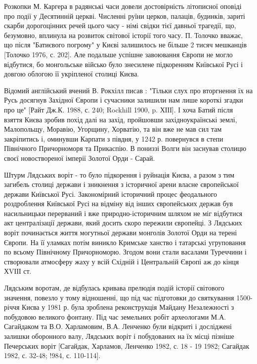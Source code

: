 Розкопки М. Каргера в радянські часи довели достовірність літописної оповіді
про події у Десятинній церкві. Численні руїни церков, палаців, будинків, зариті
скарби дорогоцінних речей цього часу - німі свідки тієї давньої трагедії, що,
безумовно, вплинула на розвиток світової історії того часу. П. Толочко вважає,
що після "Батиєвого погрому" у Києві залишилось не більше 2 тисяч мешканців
[Толочко 1976, с. 202]. Але подальше успішне завоювання Європи не могло
відбутися, бо монгольське військо було знесилене підкоренням Київської Русі і
довгою облогою її укріпленої столиці Києва.

Відомий англійський вчений В. Рокхілл писав : "Тільки слух про вторгнення їх на
Русь досягнув Західної Європи і сучасники залишили нам лише короткі згадки про
це" [Райт Дж.К. 1988, с. 240; Rockhill 1900, p. ХІІІ]. І хоча Батий після
взяття Києва зробив похід далі на захід, пройшовши західноукраїнські землі,
Малопольщу, Моравію, Угорщину, Хорватію, та він вже не мав сил там закріпитись
і, оминувши Карпати з півдня, у 1242 р. повернувся в степи Північного
Причорноморя та Прикаспію. В пониззі Волги він заснував столицю своєї
новоствореної імперії Золотої Орди - Сарай.

Штурм Лядських воріт - то було підкорення і руйнація Києва, а разом з тим
загибель столиці держави і зникнення з історичної арени власне європейської
держави Київської Русі. Закономірний історичний процес феодального роздроблення
Київської Русі на відміну від інших європейських держав був насильницьки
перерваний і вже природно-історичним шляхом не міг відбутися акт централізації
держави, який досить скоро пережили європейці. З Лядських воріт починається
життя могутньої держави монголів Золотої Орди на терені Європи. На її уламках
потім виникло Кримське ханство і татарські угруповання по всьому Північному
Причорноморю. Згодом вони стали васалами Туреччини і створювали атмосферу жаху
у всій Східній і Центральній Європі аж до кінця ХVІІІ ст.

Лядським воротам, де відбулась кривава прелюдія подій історії світового
значення, повезло у тому відношенні, що під час підготовки до святкування
1500-річчя Києва у 1981 р. була зроблена реконструкція Майдану Незалежності з
побудовою великого фонтану. Під час земельних робіт археологами М.А. Сагайдаком
та В.О. Харламовим, В.А. Ленченко були відкриті і досліджені залишки оборонного
валу, Лядських воріт і побудованих на їх місці пізніше Печерських воріт
[Сагайдак, Харламов, Ленченко 1982, с. 18 - 19 1982; Сагайдак 1982, с. 32-48;
!984, с. 110-114].

